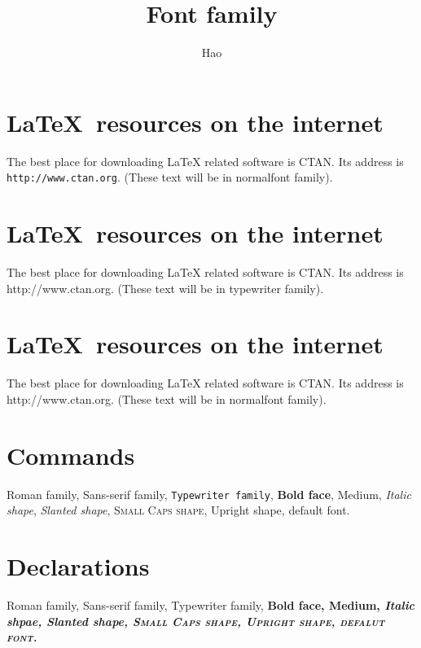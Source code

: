 \documentclass[a4paper,10pt]{article}
\title{Font family}
\author{Hao}
\begin{document}
\maketitle
\section{\textsf{\LaTeX\ resources on the internet}}
The best place for downloading LaTeX related software is CTAN.
Its address is \texttt{http://www.ctan.org}.
(These text will be in normalfont family).

\section{\sffamily\LaTeX\ resources on the internet}
The best place for downloading LaTeX related software is CTAN.
Its address is \ttfamily http://www.ctan.org.
(These text will be in typewriter family).
\normalfont

\section{{\sffamily\LaTeX\ resources on the internet}}
The best place for downloading LaTeX related software is CTAN.
Its address is {\ttfamily http://www.ctan.org}.
(These text will be in normalfont family).

\section{Commands}
\textrm{Roman family},
\textsf{Sans-serif family},
\texttt{Typewriter family},
\textbf{Bold face},
\textmd{Medium},
\textit{Italic shape},
\textsl{Slanted shape},
\textsc{Small Caps shape},
\textup{Upright shape},
\textnormal{default font}.

\section{Declarations}
\rmfamily Roman family,
\sffamily Sans-serif family,
\ttfamily Typewriter family,
\bfseries Bold face,
\mdseries Medium,
\itshape Italic shpae,
\slshape Slanted shape,
\scshape Small Caps shape,
\upshape Upright shape,
\normalfont defalut font.
\end{document}
